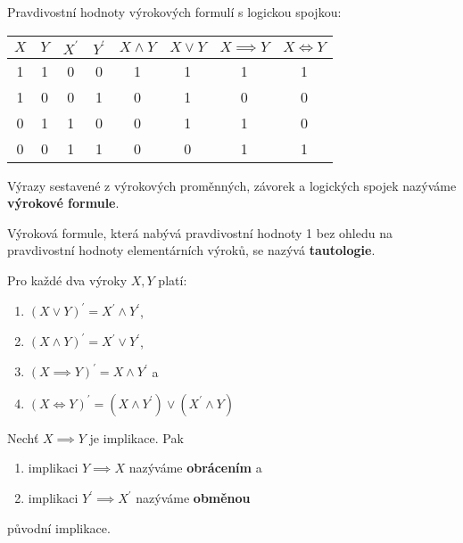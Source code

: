 \begin{pozn}
  Pravdivostní hodnoty výrokových formulí s logickou spojkou:
  \begin{center}
    \begin{tabular}{c c | c c | c c c c}
      $X$ & $Y$ & $X^\prime$ & $Y^\prime$ & $X\land Y$ & $X\lor Y$ & $X\implies Y$ & $X\iff Y$ \\
      \hline
      1 & 1 & 0 & 0 & 1 & 1 & 1 & 1 \\
      1 & 0 & 0 & 1 & 0 & 1 & 0 & 0 \\
      0 & 1 & 1 & 0 & 0 & 1 & 1 & 0 \\
      0 & 0 & 1 & 1 & 0 & 0 & 1 & 1 \\
    \end{tabular}
  \end{center}
\end{pozn}

\begin{definition}
  Výrazy sestavené z výrokových proměnných, závorek a logických spojek nazýváme \textbf{výrokové formule}.
\end{definition}

\begin{definition}
  Výroková formule, která nabývá pravdivostní hodnoty 1 bez ohledu na pravdivostní hodnoty elementárních výroků, se nazývá \textbf{tautologie}.
\end{definition}

\begin{veta}
  Pro každé dva výroky $X,Y$ platí:
  \begin{enumerate}[$i.$]
    \item $(X\lor Y)^\prime = X^\prime \land Y^\prime$,
    \item $(X\land Y)^\prime = X^\prime \lor Y^\prime$,
    \item $(X\implies Y)^\prime = X\land Y^\prime$ a
    \item $(X\iff Y)^\prime = (X\land Y^\prime) \lor (X^\prime \land Y)$
  \end{enumerate}
\end{veta}

\begin{definition}
  Nechť $X\implies Y$ je implikace. Pak
  \begin{enumerate}[$i.$]
    \item implikaci $Y\implies X$ nazýváme \textbf{obrácením} a
    \item implikaci $Y^\prime \implies X^\prime$ nazýváme \textbf{obměnou}
  \end{enumerate}
  původní implikace.
\end{definition}

